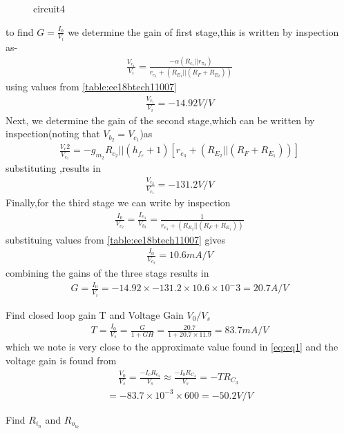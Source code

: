 \begin{enumerate}[label=\thesubsection.\arabic*.,ref=\thesubsection.\theenumi]
{\begin{figure}[!ht]
\begin{center}
		\resizebox{\columnwidth}{!}{}
	\end{center}
\caption{circuit4}
\label{fig:circuit4}
\end{figure}
to find $G=\frac{I_0}{V_i}$ we determine the gain of first stage,this is written by inspection as-
\begin{align}
    \frac{V_c_1}{V_i}=\frac{-\alpha(R_c_1||r_\pi_2)}{r_e_1+(R_E_1||(R_F+R_E_2))}
\end{align}
using values from \ref{table:ee18btech11007}
\begin{align}
\frac{V_c_1}{V_i}=-14.92V/V     
\end{align}
Next, we determine the gain of the second stage,which can be written by inspection(noting that $V_b_2=V_c_1$)as
\begin{align}
    \frac{V_c2}{V_c_1}=-g_m_2{R_c_2||(h_f_e+1)[r_e_3+(R_E_2||(R_F+R_E_1))]}
\end{align}
substituting ,results in 
\begin{align}
    \frac{V_c_2}{V_c_1}=-131.2 V/V
\end{align}
Finally,for the third stage we can write by inspection
\begin{align}
    \frac{I_0}{V_c_2}=\frac{I_e_3}{V_b_3}=\frac{1}{r_e_3+(R_E_2||(R_F+R_E_1))}
\end{align}
substituing values from \ref{table:ee18btech11007} gives
\begin{align}
    \frac{I_0}{V_c_2}=10.6mA/V
\end{align}
combining the gains of the three stags results in
\begin{align}
G=\frac{I_0}{V_i}=-14.92\times-131.2\times10.6\times10^-3=20.7A/V    
\end{align}
\item Find closed loop gain T and Voltage Gain $V_0/V_s$
\\ \solution
 \begin{align}
    T=\frac{I_0}{V_s}=\frac{G}{1+GH}=\frac{20.7}{1+20.7\times11.9}=83.7mA/V
\end{align}
which we note is very close to the approximate value found in \eqref{eq:eq1} and the voltage gain is found from 
\begin{align}
    \frac{V_0}{V_s}=\frac{-I_cR_c_3}{V_s}\approx\frac{-I_0R_C_3}{V_s}=-TR_C_3
    \
\end{align}
\begin{align}
    =-83.7\times10^{-3}\times600=-50.2V/V
\end{align}
\item Find $R_i_n$ and $R_o_u_t$
}
\end{enumerate}
